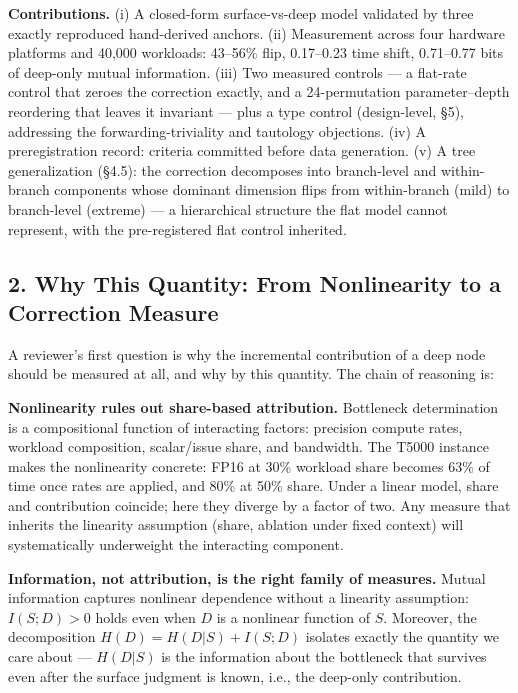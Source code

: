 \documentclass[11pt]{article}
\begin{document}
\textbf{Contributions.} (i) A closed-form surface-vs-deep model validated by three exactly reproduced hand-derived anchors. (ii) Measurement across four hardware platforms and 40,000 workloads: 43--56\% flip, 0.17--0.23 time shift, 0.71--0.77 bits of deep-only mutual information. (iii) Two measured controls --- a flat-rate control that zeroes the correction exactly, and a 24-permutation parameter--depth reordering that leaves it invariant --- plus a type control (design-level, §5), addressing the forwarding-triviality and tautology objections. (iv) A preregistration record: criteria committed before data generation. (v) A tree generalization (§4.5): the correction decomposes into branch-level and within-branch components whose dominant dimension flips from within-branch (mild) to branch-level (extreme) --- a hierarchical structure the flat model cannot represent, with the pre-registered flat control inherited.

\subsection{2. Why This Quantity: From Nonlinearity to a Correction Measure}\label{why-this-quantity-from-nonlinearity-to-a-correction-measure}

A reviewer's first question is why the incremental contribution of a deep node should be measured at all, and why by this quantity. The chain of reasoning is:

\textbf{Nonlinearity rules out share-based attribution.} Bottleneck determination is a compositional function of interacting factors: precision compute rates, workload composition, scalar/issue share, and bandwidth. The T5000 instance makes the nonlinearity concrete: FP16 at 30\% workload share becomes 63\% of time once rates are applied, and 80\% at 50\% share. Under a linear model, share and contribution coincide; here they diverge by a factor of two. Any measure that inherits the linearity assumption (share, ablation under fixed context) will systematically underweight the interacting component.

\textbf{Information, not attribution, is the right family of measures.} Mutual information captures nonlinear dependence without a linearity assumption: \(I(S;D) > 0\) holds even when \(D\) is a nonlinear function of \(S\). Moreover, the decomposition \(H(D) = H(D|S) + I(S;D)\) isolates exactly the quantity we care about --- \(H(D|S)\) is the information about the bottleneck that survives even after the surface judgment is known, i.e., the deep-only contribution.
\end{document}
